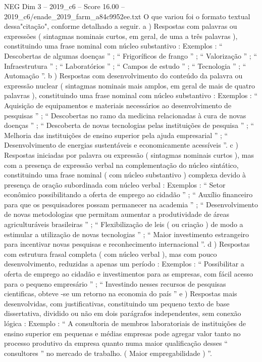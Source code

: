 \begin{textsample}{NEG Dim 3 – 2019\_c6 – Score 16.00 – 2019\_c6/enade\_2019\_farm\_a84c9952ee.txt}
O que variou foi o formato textual dessa"citação", conforme detalhado a seguir. a ) Respostas com palavras ou expressões ( sintagmas nominais curtos, em geral, de uma a três palavras ), constituindo uma frase nominal com núcleo substantivo : Exemplos : “ Descobertas de algumas doenças ” ; “ Frigoríficos de frango ” ; “ Valorização ” ; “ Infraestrutura ” ; “ Laboratórios ” ; “ Campos de estudo ” ; “ Tecnologia ” ; “ Automação ”. b ) Respostas com desenvolvimento do conteúdo da palavra ou expressão nuclear ( sintagmas nominais mais amplos, em geral de mais de quatro palavras ), constituindo uma frase nominal com núcleo substantivo : Exemplos : “ Aquisição de equipamentos e materiais necessários ao desenvolvimento de pesquisas ” ; “ Descobertas no ramo da medicina relacionadas à cura de novas doenças ” ; “ Descoberta de novas tecnologias pelas instituições de pesquisa ” ; “ Melhoria das instituições de ensino superior pela ajuda empresarial ” ; “ Desenvolvimento de energias sustentáveis e economicamente acessíveis ”. c ) Respostas iniciadas por palavra ou expressão ( sintagmas nominais curtos ), mas com a presença de expressão verbal na complementação do núcleo sintático, constituindo uma frase nominal ( com núcleo substantivo ) complexa devido à presença de oração subordinada com núcleo verbal : Exemplos : “ Setor econômico possibilitando a oferta de emprego ao cidadão ” ; “ Auxílio financeiro para que os pesquisadores possam permanecer na academia ” ; “ Desenvolvimento de novas metodologias que permitam aumentar a produtividade de áreas agriculturáveis brasileiras ” ; “ Flexibilização de leis ( ou criação ) de modo a estimular a utilização de novas tecnologias ” ; “ Maior investimento estrangeiro para incentivar novas pesquisas e reconhecimento internacional ”. d ) Respostas com estrutura frasal completa ( com núcleo verbal ), mas com pouco desenvolvimento, reduzidas a apenas um período : Exemplos : “ Possibilitar a oferta de emprego ao cidadão e investimentos para as empresas, com fácil acesso para o pequeno empresário ” ; “ Investindo nesses recursos de pesquisas cientificas, obteve -se um retorno na economia do país ” e ) Respostas mais desenvolvidas, com justificativas, constituindo um pequeno texto de base dissertativa, dividido ou não em dois parágrafos independentes, sem conexão lógica : Exemplo : “ A consultoria de membros laboratoriais de instituições de ensino superior em pequenas e médias empresas pode agregar valor tanto no processo produtivo da empresa quanto numa maior qualificação desses “ consultores ” no mercado de trabalho. ( Maior empregabilidade ) ”.

\end{textsample}
